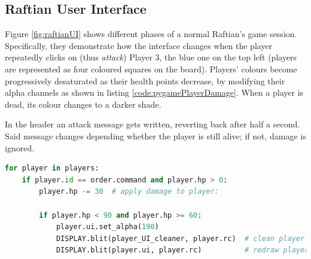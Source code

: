 \subsection{Raftian User Interface}

Figure \ref{fig:raftianUI} shows different phases of a normal Raftian's game session. Specifically, they demonstrate how the interface changes when the player repeatedly clicks on (thus \textit{attack}) Player 3, the blue one on the top left (players are represented as four coloured squares on the board). Players' colours become progressively desaturated as their health points decrease, by modifying their alpha channels as shown in listing \ref{code:pygamePlayerDamage}. When a player is dead, its colour changes to a darker shade. 

In the header an attack message gets written, reverting back after half a second. Said message changes depending whether the player is still alive; if not, damage is ignored. 

\begin{lstlisting}[language={Python},label={code:pygamePlayerDamage}, caption={Whenever a player gets damaged, its colour gets desaturated}]
for player in players:
    if player.id == order.command and player.hp > 0:
        player.hp -= 30  # apply damage to player:

        if player.hp < 90 and player.hp >= 60:
            player.ui.set_alpha(190)
            DISPLAY.blit(player_UI_cleaner, player.rc)  # clean player UI
            DISPLAY.blit(player.ui, player.rc)          # redraw player UI
\end{lstlisting}

